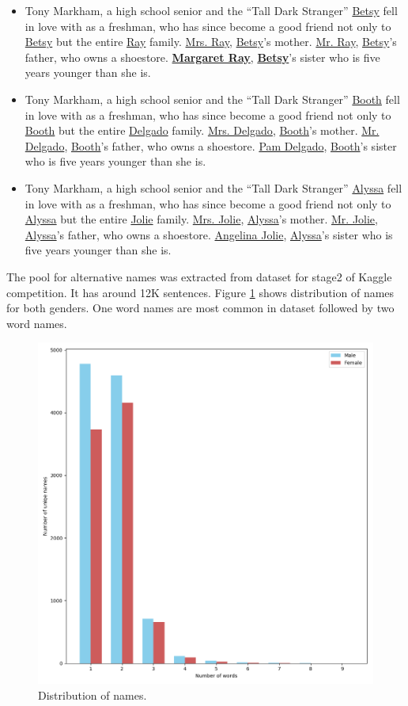 \documentclass[11pt,a4paper]{article}
\begin{document}
\begin{itemize}
\item Tony Markham, a high school senior and the ``Tall Dark Stranger'' \underline{Betsy} fell in love with as a freshman, who has since become a good friend not only to \underline{Betsy} but the entire \underline{Ray} family. \underline{Mrs. Ray}, \underline{Betsy}'s mother. \underline{Mr. Ray}, \underline{Betsy}'s father, who owns a shoestore. \textbf{\underline{Margaret Ray}}, \textbf{\underline{Betsy}}'s sister who is five years younger than she is.
  
\item Tony Markham, a high school senior and the ``Tall Dark Stranger'' \underline{Booth} fell in love with as a freshman, who has since become a good friend not only to \underline{Booth} but the entire \underline{Delgado} family. \underline{Mrs. Delgado}, \underline{Booth}'s mother. \underline{Mr. Delgado}, \underline{Booth}'s father, who owns a shoestore. \underline{Pam Delgado}, \underline{Booth}'s sister who is five years younger than she is.

\item Tony Markham, a high school senior and the ``Tall Dark Stranger'' \underline{Alyssa} fell in love with as a freshman, who has since become a good friend not only to \underline{Alyssa} but the entire \underline{Jolie} family. \underline{Mrs. Jolie}, \underline{Alyssa}'s mother. \underline{Mr. Jolie}, \underline{Alyssa}'s father, who owns a shoestore. \underline{Angelina Jolie}, \underline{Alyssa}'s sister who is five years younger than she is.
\end{itemize}

  
The pool for alternative names was extracted from dataset for stage2 of Kaggle competition. It has around 12K sentences. Figure \ref{fig:augment_dist} shows distribution of names for both genders. One word names are most common in dataset followed by two word names.

\begin{figure}
  \centering
  \includegraphics[width=.5\textwidth]{augment_dist.png}
  \caption{Distribution of names.}
  \label{fig:augment_dist}
\end{figure}
\end{document}

